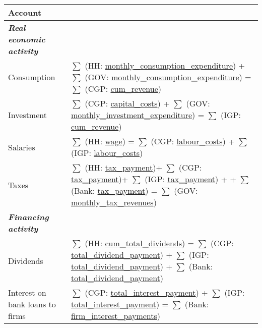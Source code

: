 \thispagestyle{empty}
\begin{landscape}
\begin{table}
  \centering\footnotesize
  \begin{tabular}{|l|l|}
  \hline\hline
    Account     & \\
    \hline
\textbf{\emph{Real economic activity}} &\\
    \hline
    Consumption & $\sum$ (HH: \url{monthly_consumption_expenditure}) + $\sum$ (GOV: \url{monthly_consumption_expenditure}) = $\sum$ (CGP:  \url{cum_revenue})\\\hline
    Investment  & $\sum$ (CGP: \url{capital_costs}) + $\sum$ (GOV: \url{monthly_investment_expenditure}) =  $\sum$ (IGP: \url{cum_revenue})\\\hline
    Salaries    & $\sum$ (HH: \url{wage}) = $\sum$ (CGP: \url{labour_costs}) + $\sum$ (IGP: \url{labour_costs})\\\hline
    Taxes       & $\sum$ (HH: \url{tax_payment})+ $\sum$ (CGP: \url{tax_payment})+ $\sum$ (IGP: \url{tax_payment}) + + $\sum$ (Bank: \url{tax_payment}) = $\sum$ (GOV:  \url{monthly_tax_revenues})\\\hline
    \hline    
\textbf{\emph{Financing activity}}  &\\
    \hline
    Dividends & $\sum$ (HH: \url{cum_total_dividends}) = $\sum$ (CGP: \url{total_dividend_payment}) + $\sum$ (IGP: \url{total_dividend_payment}) + $\sum$ (Bank: \url{total_dividend_payment})\\\hline
    Interest on bank loans to firms & $\sum$ (CGP: \url{total_interest_payment}) + $\sum$ (IGP: \url{total_interest_payment}) = $\sum$ (Bank: \url{firm_interest_payments})\\\hline

\end{tabular}
\end{table}
\end{landscape}

